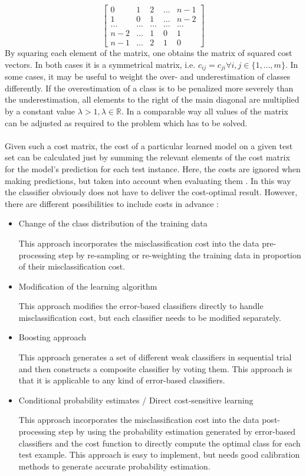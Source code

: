 \documentclass[article,type=msc,colorback,accentcolor=tud7b]{tudthesis}
\begin{document}
    \[\left[ \begin{array}{ccccc}
    {0} & {1} & {2} & {\dots} & {n-1} \\
    {1} & {0} & {1} & {\dots} & {n-2} \\
    {\dots} & {\dots} & {\dots} & {\dots} & {\dots} \\
    {n-2} & {\dots} & {1} & {0} & {1} \\
    {n-1} & {\dots} & {2} & {1} & {0}
    \end{array}\right]\]
    By squaring each element of the matrix, one obtains the matrix of squared cost vectors. In both cases it is a symmetrical matrix, i.e. $c_{ij}=c_{ji}\forall i,j\in\{1, \dots, m\}$. In some cases, it may be useful to weight the over- and underestimation of classes differently. If the overestimation of a class is to be penalized more severely than the underestimation, all elements to the right of the main diagonal are multiplied by a constant value $\lambda>1,\lambda\in\mathbb{R}$. In a comparable way all values of the matrix can be adjusted as required to the problem which has to be solved. \\\\
    Given such a cost matrix, the cost of a particular learned model on a given test set can be calculated just by summing the relevant elements of the cost matrix for the model’s prediction for each test instance. Here, the costs are ignored when making predictions, but taken into account when evaluating them \autocite[Chapter~5.7]{Witten2005}. In this way the classifier obviously does not have to deliver the cost-optimal result. However, there are different possibilities to include costs in advance \autocite[Chapter~2.3]{Qin2010}:
    \begin{itemize}
      \item Change of the class distribution of the training data
        
        This approach incorporates the misclassification cost into the data pre-processing step by re-sampling or re-weighting the training data in proportion of their misclassification cost.
      \item Modification of the learning algorithm
        
        This approach modifies the error-based classifiers directly to handle misclassification cost, but each classifier needs to be modified separately.
      \item Boosting approach
        
        This approach generates a set of different weak classifiers in sequential trial and then constructs a composite classifier by voting them. This approach is that it is applicable to any kind of error-based classifiers.
      \item Conditional probability estimates / Direct cost-sensitive learning
        
        This approach incorporates the misclassification cost into the data post-processing step by using the probability estimation generated by error-based classifiers and the cost function to directly compute the optimal class for each test example. This approach is easy to implement, but needs good calibration methods to generate accurate probability estimation.
    \end{itemize}
\end{document}
